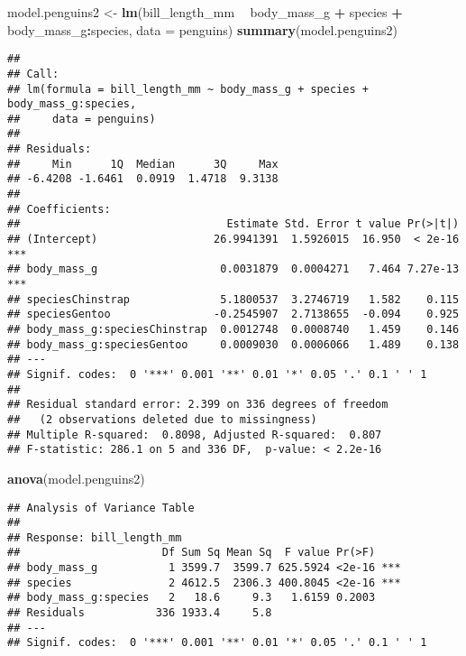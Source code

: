 \documentclass[
]{book}
\newenvironment{Shaded}{\begin{snugshade}}{\end{snugshade}}
\newcommand{\DataTypeTok}[1]{\textcolor[rgb]{0.13,0.29,0.53}{#1}}
\newcommand{\KeywordTok}[1]{\textcolor[rgb]{0.13,0.29,0.53}{\textbf{#1}}}
\newcommand{\NormalTok}[1]{#1}
\newcommand{\OperatorTok}[1]{\textcolor[rgb]{0.81,0.36,0.00}{\textbf{#1}}}
\newcommand{\StringTok}[1]{\textcolor[rgb]{0.31,0.60,0.02}{#1}}
\begin{document}
\begin{Shaded}
\begin{Highlighting}[]
\NormalTok{model.penguins2 <-}\StringTok{ }\KeywordTok{lm}\NormalTok{(bill_length_mm }\OperatorTok{~}\StringTok{ }\NormalTok{body_mass_g }\OperatorTok{+}\StringTok{ }\NormalTok{species }\OperatorTok{+}\StringTok{ }\NormalTok{body_mass_g}\OperatorTok{:}\NormalTok{species, }\DataTypeTok{data =}\NormalTok{ penguins)}
\KeywordTok{summary}\NormalTok{(model.penguins2)}
\end{Highlighting}
\end{Shaded}

\begin{verbatim}
## 
## Call:
## lm(formula = bill_length_mm ~ body_mass_g + species + body_mass_g:species, 
##     data = penguins)
## 
## Residuals:
##     Min      1Q  Median      3Q     Max 
## -6.4208 -1.6461  0.0919  1.4718  9.3138 
## 
## Coefficients:
##                                Estimate Std. Error t value Pr(>|t|)    
## (Intercept)                  26.9941391  1.5926015  16.950  < 2e-16 ***
## body_mass_g                   0.0031879  0.0004271   7.464 7.27e-13 ***
## speciesChinstrap              5.1800537  3.2746719   1.582    0.115    
## speciesGentoo                -0.2545907  2.7138655  -0.094    0.925    
## body_mass_g:speciesChinstrap  0.0012748  0.0008740   1.459    0.146    
## body_mass_g:speciesGentoo     0.0009030  0.0006066   1.489    0.138    
## ---
## Signif. codes:  0 '***' 0.001 '**' 0.01 '*' 0.05 '.' 0.1 ' ' 1
## 
## Residual standard error: 2.399 on 336 degrees of freedom
##   (2 observations deleted due to missingness)
## Multiple R-squared:  0.8098, Adjusted R-squared:  0.807 
## F-statistic: 286.1 on 5 and 336 DF,  p-value: < 2.2e-16
\end{verbatim}

\begin{Shaded}
\begin{Highlighting}[]
\KeywordTok{anova}\NormalTok{(model.penguins2)}
\end{Highlighting}
\end{Shaded}

\begin{verbatim}
## Analysis of Variance Table
## 
## Response: bill_length_mm
##                      Df Sum Sq Mean Sq  F value Pr(>F)    
## body_mass_g           1 3599.7  3599.7 625.5924 <2e-16 ***
## species               2 4612.5  2306.3 400.8045 <2e-16 ***
## body_mass_g:species   2   18.6     9.3   1.6159 0.2003    
## Residuals           336 1933.4     5.8                    
## ---
## Signif. codes:  0 '***' 0.001 '**' 0.01 '*' 0.05 '.' 0.1 ' ' 1
\end{verbatim}
\end{document}
